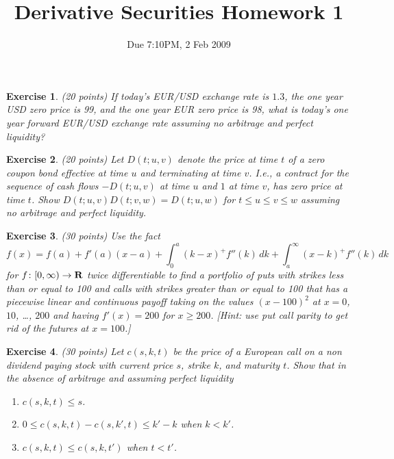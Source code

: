 \documentclass[11pt,fleqn]{amsproc}
\newcommand{\R}{{\bf R}}
\newtheorem{xca}{Exercise}
\begin{document}
\title{Derivative Securities Homework 1}
\author{Due 7:10PM, 2 Feb 2009}

\maketitle

\begin{xca}{(20 points)}
If today's EUR/USD exchange rate is $1.3$, the one year USD zero price is 99,
and the one year EUR zero price is 98, what is today's one year forward 
EUR/USD exchange rate assuming no arbitrage and perfect liquidity?
\end{xca}

\begin{xca}{(20 points)}
Let $D(t; u, v)$ denote the price at time $t$ of a zero coupon bond
effective at time $u$ and terminating at time $v$. I.e.,
a contract for the sequence of cash flows $-D(t; u, v)$ at time 
$u$ and $1$ at time $v$, has zero price at time $t$.
Show $D(t; u, v) D(t; v, w) = D(t; u, w)$ for $t\le u\le v\le w$
assuming no arbitrage and perfect liquidity.
\end{xca}

\begin{xca}{(30 points)}
Use the fact 
\begin{equation*}
f(x) = f(a) + f'(a)(x - a) + \int_0^a (k - x)^+ f''(k)\,dk 
+ \int_a^\infty (x - k)^+ f''(k)\,dk
\end{equation*}
for $f\colon[0,\infty)\to\R$ twice 
differentiable to find a portfolio of puts with strikes less than or equal 
to 100 and calls with strikes greater than or equal to 100 that has a piecewise 
linear and continuous payoff taking on the values $(x - 100)^2$ at $x = 0$, $10$, \dots, $200$ and having $f'(x) = 200$ for $x \ge 200$. {\rm [Hint: use put call parity to get rid of the futures at $x = 100$.]}
\end{xca}

\begin{xca}{(30 points)}
Let $c(s, k, t)$ be the price of a European call on a non dividend paying stock with current price $s$, strike $k$, and maturity $t$. Show that in the absence of arbitrage and assuming perfect liquidity
\begin{enumerate}
\item $c(s, k, t) \le s$.
\item $0 \le c(s, k, t) - c(s, k', t) \le k' - k$ when $k < k'$.
\item $c(s, k, t) \le c(s, k, t')$ when $t < t'$.
\end{enumerate}
\end{xca}
\end{document}

